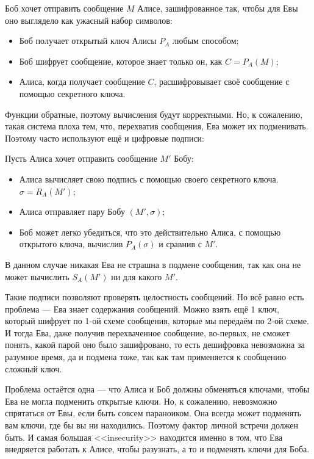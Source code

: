 \documentclass[a4paper, 12pt]{article}
\begin{document}
\begin{center}
  Боб хочет отправить сообщение $M$ Алисе, зашифрованное так, чтобы для Евы оно
  выглядело как ужасный набор символов:
  \begin{itemize}
    \item Боб получает открытый ключ Алисы $P_{A}$ любым способом;
    \item Боб шифрует сообщение, которое знает только он, как $C = P_{A}(M)$;
    \item Алиса, когда получает сообщение $C$, расшифровывает своё сообщение с
    помощью секретного ключа.
  \end{itemize}
\end{center}

Функции обратные, поэтому вычисления будут корректными. Но, к сожалению, такая система
плоха тем, что, перехватив сообщения, Ева может их подменивать. Поэтому
часто используют ещё и цифровые подписи:

\begin{center}
Пусть Алиса хочет отправить сообщение $M'$ Бобу:
  \begin{itemize}
    \item Алиса вычисляет свою подпись с помощью своего секретного ключа.
    $\sigma = R_{A}(M')$;
    \item Алиса отправляет пару Бобу $(M', \sigma)$;
    \item Боб может легко убедиться, что это действительно Алиса, с помощью
    открытого ключа, вычислив $P_{A}(\sigma)$ и сравнив с $M'$.
  \end{itemize}
\end{center}

В данном случае никакая Ева не страшна в подмене сообщения, так как она не может
вычислить $S_{A}(M')$ ни для какого $M'$.

Такие подписи позволяют проверять целостность сообщений. Но всё равно есть
проблема --- Ева знает содержания сообщений. Можно взять ещё 1 ключ, который
шифрует по 1-ой схеме сообщения, которые мы передаём по 2-ой схеме. И тогда
Ева, даже получив перехваченное сообщение, во-первых, не сможет понять, какой
парой оно было зашифровано, то есть дешифровка невозможна за разумное время,
да и подмена тоже, так как там применяется к сообщению сложный ключ.

Проблема остаётся одна --- что Алиса и Боб должны обменяться ключами, чтобы
Ева не могла подменить открытые ключи. Но, к сожалению, невозможно спрятаться
от Евы, если быть совсем параноиком. Она всегда может подменять вам ключи, где
бы вы ни находились. Поэтому фактор личной встречи должен быть. И самая большая
<<insecurity>> находится именно в том, что Ева внедряется работать к Алисе,
чтобы разузнать, а то и подменять ключи для Боба.
\end{document}
